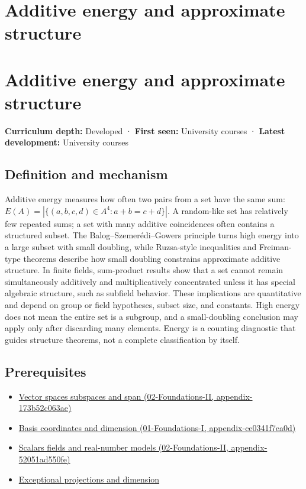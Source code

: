 \hypertarget{appendix-b0732b22e7d6}{}
\section*{Additive energy and approximate structure}
\section{Additive energy and approximate structure}\label{additive-energy-and-approximate-structure}

\textbf{Curriculum depth:} Developed · \textbf{First seen:} University courses · \textbf{Latest development:} University courses

\subsection{Definition and mechanism}\label{definition-and-mechanism}

Additive energy measures how often two pairs from a set have the same sum: \(E(A)=|\{(a,b,c,d)\in A^4:a+b=c+d\}|\). A random-like set has relatively few repeated sums; a set with many additive coincidences often contains a structured subset. The Balog--Szemerédi--Gowers principle turns high energy into a large subset with small doubling, while Ruzsa-style inequalities and Freiman-type theorems describe how small doubling constrains approximate additive structure. In finite fields, sum-product results show that a set cannot remain simultaneously additively and multiplicatively concentrated unless it has special algebraic structure, such as subfield behavior. These implications are quantitative and depend on group or field hypotheses, subset size, and constants. High energy does not mean the entire set is a subgroup, and a small-doubling conclusion may apply only after discarding many elements. Energy is a counting diagnostic that guides structure theorems, not a complete classification by itself.

\subsection{Prerequisites}\label{prerequisites}

\begin{itemize}
\tightlist
\item
  \href{}{Vector spaces subspaces and span (02-Foundations-II, appendix-173b52c063ae)}
\item
  \href{}{Basis coordinates and dimension (01-Foundations-I, appendix-ce0341f7ea0d)}
\item
  \href{}{Scalars fields and real-number models (02-Foundations-II, appendix-52051ad550fe)}
\item
  \hyperref[appendix-3c73f7862157]{Exceptional projections and dimension}
\end{itemize}

